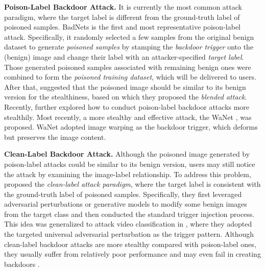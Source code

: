 \noindent \textbf{Poison-Label Backdoor Attack.}
It is currently the most common attack paradigm, where the target label is different from the ground-truth label of poisoned samples. BadNets \citep{gu2017badnets} is the first and most representative poison-label attack. %
Specifically, it randomly selected a few samples from the original benign dataset to generate \emph{poisoned samples} by stamping the \emph{backdoor trigger} onto the (benign) image and change their label with an attacker-specified \emph{target label}. Those generated poisoned samples associated with remaining benign ones were combined to form the \emph{poisoned training dataset}, which will be delivered to users. After that, \citep{chen2017targeted} suggested that the poisoned image should be similar to its benign version for the stealthiness, based on which they proposed the \emph{blended attack}. %
Recently, \citep{xue2020one,li2020invisible,li2021invisible} further explored how to conduct poison-label backdoor attacks more stealthily. Most recently, a more stealthy and effective attack, the WaNet \citep{nguyen2021wanet}, was proposed. WaNet adopted image warping as the backdoor trigger, which deforms but preserves the image content. 

\noindent \textbf{Clean-Label Backdoor Attack.} 
Although the poisoned image generated by poison-label attacks could be similar to its benign version, users may still notice the attack by examining the image-label relationship. To address this problem, \cite{turner2019label} proposed the \emph{clean-label attack paradigm}, where the target label is consistent with the ground-truth label of poisoned samples. Specifically, they first leveraged adversarial perturbations or generative models to modify some benign images from the target class and then conducted the standard trigger injection process. %
This idea was generalized to attack video classification in \citep{zhao2020clean}, where they adopted the targeted universal adversarial perturbation \citep{moosavi2017universal} as the trigger pattern. %
Although clean-label backdoor attacks are more stealthy compared with poison-label ones, they usually suffer from relatively poor performance and may even fail in creating backdoors \citep{li2020backdoor}.

